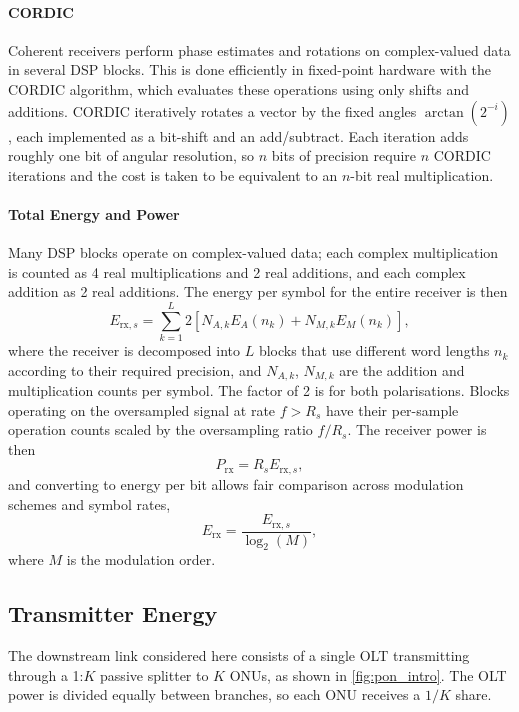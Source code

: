 \documentclass[12pt,a4paper]{report}
\begin{document}
\paragraph{CORDIC}
Coherent receivers perform phase estimates and rotations on complex-valued data in several DSP blocks. This is done efficiently in fixed-point hardware with the CORDIC algorithm, which evaluates these operations using only shifts and additions. CORDIC iteratively rotates a vector by the fixed angles \(\arctan(2^{-i})\), each implemented as a bit-shift and an add/subtract. Each iteration adds roughly one bit of angular resolution, so $n$ bits of precision require $n$ CORDIC iterations and the cost is taken to be equivalent to an $n$-bit real multiplication.

\paragraph{Total Energy and Power}
Many DSP blocks operate on complex-valued data; each complex multiplication is counted as 4 real multiplications and 2 real additions, and each complex addition as 2 real additions. The energy per symbol for the entire receiver is then
\begin{equation}
    E_{\mathrm{rx},s} = \sum_{k=1}^{L} 2 \left[ N_{A,k}E_A(n_k) + N_{M,k}E_M(n_k) \right],
\end{equation}
where the receiver is decomposed into \(L\) blocks that use different word lengths \(n_k\) according to their required precision, and \(N_{A,k}\), \(N_{M,k}\) are the addition and multiplication counts per symbol. The factor of 2 is for both polarisations. Blocks operating on the oversampled signal at rate \(f > R_s\) have their per-sample operation counts scaled by the oversampling ratio \(f/R_s\). The receiver power is then
\begin{equation}
    P_\mathrm{rx} = R_s E_{\mathrm{rx},s},
\end{equation}
and converting to energy per bit allows fair comparison across modulation schemes and symbol rates,
\begin{equation}
    E_\mathrm{rx} = \frac{E_{\mathrm{rx},s}}{\log_2(M)},
    \label{eq:rx_energy}
\end{equation}
where \(M\) is the modulation order.
\subsection{Transmitter Energy}
The downstream link considered here consists of a single OLT transmitting through a 1:\(K\) passive splitter to \(K\) ONUs, as shown in \cref{fig:pon_intro}. The OLT power is divided equally between branches, so each ONU receives a \(1/K\) share.
\end{document}
